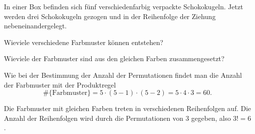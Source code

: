 In einer Box befinden sich fünf verschiedenfarbig verpackte Schokokugeln.
Jetzt werden drei Schokokugeln gezogen und in der Reihenfolge der Ziehung
nebeneinandergelegt.
\begin{teilaufgaben}
\item
Wieviele verschiedene Farbmuster können entstehen?
\item
Wieviele der Farbmuster sind aus den gleichen Farben zusammengesetzt?
\end{teilaufgaben}

\begin{loesung}
\begin{teilaufgaben}
\item
Wie bei der Bestimmung der Anzahl der Permutationen findet man die
Anzahl der Farbmuster mit der Produktregel
\[
\#\{\text{Farbmuster}\}
=
5\cdot(5-1)\cdot(5-2) = 5\cdot 4\cdot 3 = 60.
\]
\item
Die Farbmuster mit gleichen Farben treten in verschiedenen Reihenfolgen auf.
Die Anzahl der Reihenfolgen wird durch die Permutationen von 3 gegeben, also
$3!=6$.
\qedhere
\end{teilaufgaben}
\end{loesung}

